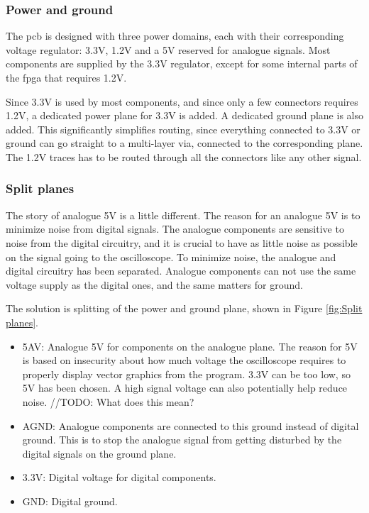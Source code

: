 \subsubsection{Power and ground}
\label{Power}
The \gls{pcb} is designed with three power domains, each with their corresponding voltage regulator: 3.3V, 1.2V and a 5V reserved for analogue signals.
Most components are supplied by the 3.3V regulator, except for some internal parts of the \gls{fpga} that requires 1.2V.

Since 3.3V is used by most components, and since only a few connectors requires 1.2V, a dedicated power plane for 3.3V is added.
A dedicated ground plane is also added.
This significantly simplifies routing, since everything connected to 3.3V or ground can go straight to a multi-layer via, connected to the corresponding plane.
The 1.2V traces has to be routed through all the connectors like any other signal.

\subsubsection{Split planes}
The story of analogue 5V is a little different.
The reason for an analogue 5V is to minimize noise from digital signals.
The analogue components are sensitive to noise from the digital circuitry, and it is crucial to have as little noise as possible on the signal going to the oscilloscope.
To minimize noise, the analogue and digital circuitry has been separated.
Analogue components can not use the same voltage supply as the digital ones, and the same matters for ground.

The solution is splitting of the power and ground plane, shown in Figure \ref{fig:Split planes}.
\begin{itemize}
\item 5AV: Analogue 5V for components on the analogue plane.
The reason for 5V is based on insecurity about how much voltage the oscilloscope requires to properly display vector graphics from the program.
3.3V can be too low, so 5V has been chosen.
A high signal voltage can also potentially help reduce noise. //TODO: What does this mean?
\item AGND: Analogue components are connected to this ground instead of digital ground.
This is to stop the analogue signal from getting disturbed by the digital signals on the ground plane.
\item 3.3V: Digital voltage for digital components.
\item GND: Digital ground.
\end{itemize}

